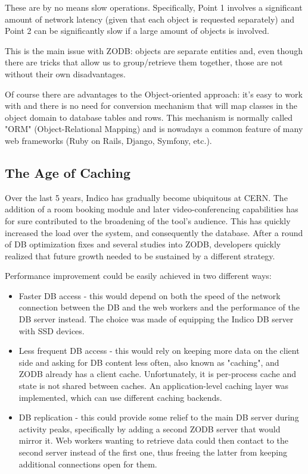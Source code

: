 These are by no means slow operations. Specifically, Point 1 involves a significant amount of network latency (given that each object is requested separately) and Point 2 can be significantly slow if a large amount of objects is involved.

This is the main issue with ZODB: objects are separate entities and, even though there are tricks that allow us to group/retrieve them together, those are not without their own disadvantages.

Of course there are advantages to the Object-oriented approach: it's easy to work with and there is no need for conversion mechanism that will map classes in the object domain to database tables and rows. This mechanism is normally called "ORM" (Object-Relational Mapping) and is nowadays a common feature of many web frameworks (Ruby on Rails, Django, Symfony, etc.).

\subsection{The Age of Caching}

Over the last 5 years, Indico has gradually become ubiquitous at CERN. The addition of a room booking module and later video-conferencing capabilities has for sure contributed to the broadening of the tool's audience. This has quickly increased the load over the system, and consequently the database. After a round of DB optimization fixes and several studies into ZODB, developers quickly realized that future growth needed to be sustained by a different strategy.

Performance improvement could be easily achieved in two different ways:

\begin{itemize}
  \item Faster DB access - this would depend on both the speed of the network connection between the DB and the web workers and the performance of the DB server instead. The choice was made of equipping the Indico DB server with SSD devices.
  \item Less frequent DB access - this would rely on keeping more data on the client side and asking for DB content less often, also known as "caching", and ZODB already has a client cache. Unfortunately, it is per-process cache and state is not shared between caches. An application-level caching layer was implemented, which can use different caching backends.
  \item DB replication - this could provide some relief to the main DB server during activity peaks, specifically by adding a second ZODB server that would mirror it. Web workers wanting to retrieve data could then contact to the second server instead of the first one, thus freeing the latter from keeping additional connections open for them.
\end{itemize}

